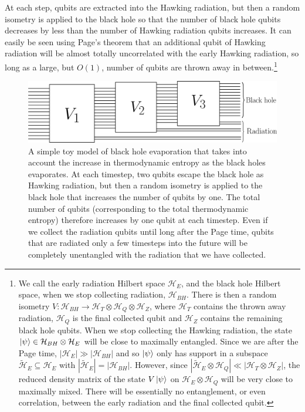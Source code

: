 \documentclass[11pt,a4paper]{article}
\begin{document}
At each step, qubits are extracted into the Hawking radiation, but then a random isometry is applied to the black hole so that the number of black hole qubits decreases by less than the number of Hawking radiation qubits increases. It can easily be seen using Page's theorem \cite{page1993average} that an additional qubit of Hawking radiation will be almost totally uncorrelated with the early Hawking radiation, so long as a large, but $O(1)$, number of qubits are thrown away in between.\footnote{We call the early radiation Hilbert space $\mathcal{H}_E$, and the black hole Hilbert space, when we stop collecting radiation, $\mathcal{H}_{BH}$. There is then a random isometry $V: \mathcal{H}_{BH} \to \mathcal{H}_T \otimes \mathcal{H}_Q \otimes \mathcal{H}_Z$, where $\mathcal{H}_T$ contains the thrown away radiation, $\mathcal{H}_Q$ is the final collected qubit and $\mathcal{H}_Z$ contains the remaining black hole qubits.  When we stop collecting the Hawking radiation, the state $\ket{\psi} \in \mathcal{H}_{BH} \otimes \mathcal{H}_E$ will be close to maximally entangled. Since we are after the Page time, $|\mathcal{H}_E| \gg |\mathcal{H}_{BH}|$ and so $\ket{\psi}$ only has support in a subspace $\tilde{\mathcal{H}}_E \subseteq \mathcal{H}_E$ with $|\tilde{\mathcal{H}}_E| = |\mathcal{H}_{BH}|$.  However, since $|\tilde{\mathcal{H}}_E \otimes \mathcal{H}_Q| \ll |\mathcal{H}_T \otimes \mathcal{H}_Z |$, the reduced density matrix of the state $V \ket{\psi}$ on $\mathcal{H}_E \otimes \mathcal{H}_Q$ will be very close to maximally mixed. There will be essentially no entanglement, or even correlation, between the early radiation and the final collected qubit.}
\begin{figure}[t]
\includegraphics[width = 0.95\linewidth]{Irreversible.png}
\centering
\caption{A simple toy model of black hole evaporation that takes into account the increase in thermodynamic entropy as the black holes evaporates. At each timestep, two qubits escape the black hole as Hawking radiation, but then a random isometry is applied to the black hole that increases the number of qubits by one. The total number of qubits (corresponding to the total thermodynamic entropy) therefore increases by one qubit at each timestep. Even if we collect the radiation qubits until long after the Page time, qubits that are radiated only a few timesteps into the future will be completely unentangled with the radiation that we have collected.}
\label{fig:irreversible}
\end{figure}
\end{document}
